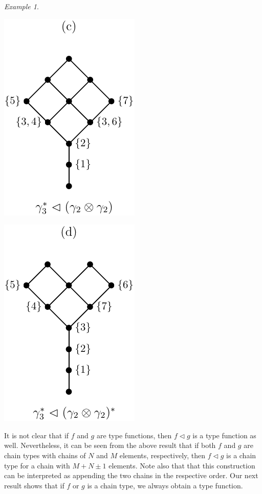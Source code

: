 \documentclass[12pt]{article}
\theoremstyle{definition}
\theoremstyle{remark}
\newtheorem{exm}{Example}
\def\vtl{\vartriangleleft}
\begin{document}
\begin{exm}
\begin{center}
\begin{minipage}[c]{0.23\textwidth}
\centering
\includegraphics[scale=0.7]{vtl_c.pdf}
\end{minipage}
\begin{minipage}[c]{0.23\textwidth}
\centering
\includegraphics[scale=0.7]{vtl_d.pdf}
\end{minipage}
\end{center}



\end{exm}





It is not clear that if $f$ and $g$ are type functions, then $f\vtl g$ is a type function as well. 
Nevertheless, it can be seen from the above result
that if both $f$ and $g$ are chain types with chains of $N$ and $M$ elements,
respectively, then $f\vtl g$ is a chain type for a chain with $M+N\pm 1$
elements. Note also that that this construction can be
interpreted as appending the two chains in the respective order. 
Our next result shows that if $f$ or $g$ is a chain type, we always obtain a type
function.
\end{document}
